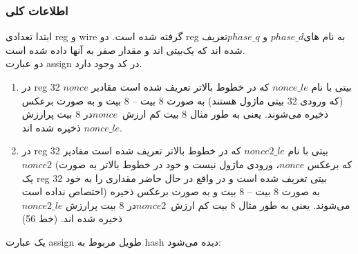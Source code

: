 \subsubsection{اطلاعات کلی}
ابتدا تعدادی reg و wire گرفته شده است.
دو reg به نام های$ phase\_d$ و $phase\_q $تعریف شده اند که یک‌بیتی اند و مقدار صفر به آنها داده شده است.\\
دو عبارت assign در کد وجود دارد.

\begin{enumerate}
	\item در reg 32 بیتی با نام $nonce\_le$ که در خطوط بالاتر تعریف شده است مقادیر $nonce$ (که ورودی 32 بیتی ماژول هستند) به صورت 8 بیت – 8 بیت و به صورت برعکس ذخیره می‌شوند. یعنی به طور مثال 8 بیت کم ارزش\  $nonce$در 8 بیت پرارزش $nonce\_le$ ذخیره شده اند.
	      
	\item در reg 32 بیتی با نام $nonce2\_le$ که در خطوط بالاتر تعریف شده است مقادیر $nonce2$ (که برعکس $nonce$، ورودی ماژول نیست و خود در خطوط بالاتر به صورت یک reg 32 بیتی تعریف شده است و در واقع در حال حاضر مقداری را به خود اختصاص نداده است) به صورت 8 بیت – 8 بیت و به صورت برعکس ذخیره می‌شوند. یعنی به طور مثال 8 بیت کم ارزش\  $nonce2$در 8 بیت پرارزش  $nonce2\_le$ ذخیره شده اند. (خط 56)
\end{enumerate}

یک عبارت assign طویل مربوط به hash دیده می‌شود:

